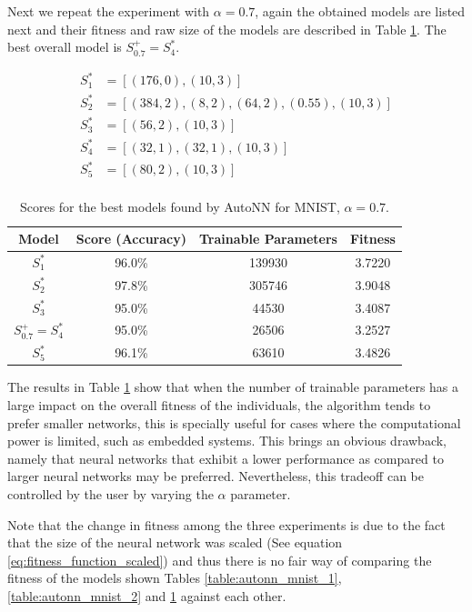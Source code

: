 \documentclass[journal]{IEEEtran}
\begin{document}
Next we repeat the experiment with $\alpha = 0.7$, again the obtained models are listed next and their fitness and raw size of the models are described in Table \ref{table:autonn_mnist_3}. The best overall model is $S^+_{0.7} = S^*_4$.

\begin{align*}
S^*_1 & = \left[ (176, 0), (10, 3) \right] \\
S^*_2 & = \left[ (384, 2), (8, 2), (64, 2), (0.55), (10, 3) \right] \\
S^*_3 & = \left[ (56, 2), (10, 3) \right] \\
S^*_4 & = \left[ (32, 1), (32, 1), (10, 3) \right] \\
S^*_5 & = \left[ (80, 2),  (10, 3) \right] \\
\end{align*}

\begin{table}[!htb]
\begin{center}
\begin{tabular}{| c | c | c | c |}
\hline
Model & Score (Accuracy) & Trainable Parameters & Fitness\\
\hline
$S^*_1$ & 96.0\% & 139930 & 3.7220\\
$S^*_2$ & 97.8\% & 305746 & 3.9048\\
$S^*_3$ & 95.0\% & 44530 & 3.4087\\
$S^+_{0.7} = S^*_4$ & 95.0\% & 26506 & 3.2527\\
$S^*_5$ & 96.1\% & 63610 & 3.4826\\
\hline
\end{tabular}
\end{center}
\caption{Scores for the best models found by AutoNN for MNIST, $\alpha = 0.7$.}
\label{table:autonn_mnist_3}
\end{table}

The results in Table \ref{table:autonn_mnist_3} show that when the number of trainable parameters has a large impact on the overall fitness of the individuals, the algorithm tends to prefer smaller networks, this is specially useful for cases where the computational power is limited, such as embedded systems. This brings an obvious drawback, namely that neural networks that exhibit a lower performance as compared to larger neural networks may be preferred. Nevertheless, this tradeoff can be controlled by the user by varying the $\alpha$ parameter. 

Note that the change in fitness among the three experiments is due to the fact that the size of the neural network was scaled (See equation \ref{eq:fitness_function_scaled}) and thus there is no fair way of comparing the fitness of the models shown Tables \ref{table:autonn_mnist_1}, \ref{table:autonn_mnist_2} and \ref{table:autonn_mnist_3} against each other.
\end{document}
